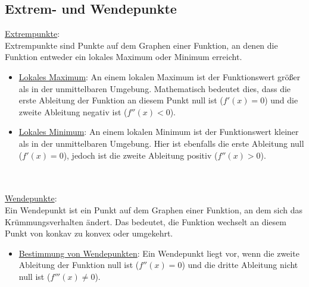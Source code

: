 \subsection{Extrem- und Wendepunkte}
\underline{Extrempunkte}: \\
Extrempunkte sind Punkte auf dem Graphen einer Funktion, 
an denen die Funktion entweder ein lokales Maximum oder Minimum erreicht.
\begin{itemize}
    \item \underline{Lokales Maximum}: 
        An einem lokalen Maximum ist der Funktionswert größer als in der unmittelbaren Umgebung. Mathematisch bedeutet dies, 
        dass die erste Ableitung der Funktion an diesem Punkt null ist ($f'(x)=0$) und die zweite Ableitung negativ ist ($f''(x)<0$).
    \item \underline{Lokales Minimum}: 
        An einem lokalen Minimum ist der Funktionswert kleiner als in der unmittelbaren Umgebung. 
        Hier ist ebenfalls die erste Ableitung null ($f'(x)=0$), 
        jedoch ist die zweite Ableitung positiv ($f''(x)>0$).
\end{itemize} 
\
\\\\
\underline{Wendepunkte}: \\
Ein Wendepunkt ist ein Punkt auf dem Graphen einer Funktion, 
an dem sich das Krümmungsverhalten ändert. 
Das bedeutet, die Funktion wechselt an diesem Punkt von konkav zu konvex oder umgekehrt.
\begin{itemize}
    \item \underline{Bestimmung von Wendepunkten}: 
        Ein Wendepunkt liegt vor, 
        wenn die zweite Ableitung der Funktion null ist ($f''(x)=0$) und die dritte Ableitung nicht null ist ($f'''(x)\neq 0$). 
\end{itemize}
